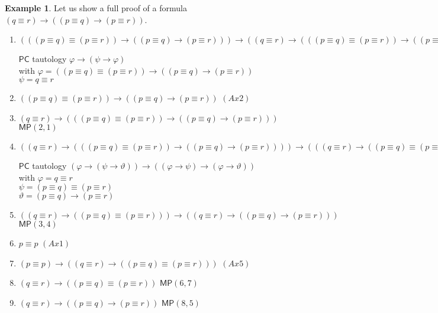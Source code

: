 \documentclass{article}
\theoremstyle{definition}
\theoremstyle{definition}
\newtheorem{example}{Example}[section]
\theoremstyle{definition}
\theoremstyle{definition}
\theoremstyle{definition}
\newcommand*{\id}{\equiv}
\newcommand*{\ra}{\rightarrow}
\newcommand{\PC}{$\mathsf{PC}$\xspace}
\newcommand{\MP}{\mathsf{MP}}
\begin{document}
\begin{example}
    \label{ex_pqr}
    Let us show a full proof of a formula $(q \id r) \ra ((p \id q) \ra (p \id r))$.

    \begin{enumerate}
        \item $(((p \id q) \id (p \id r)) \ra ((p \id q) \ra (p \id r))) \ra ((q \id r) \ra (((p \id q) \id (p \id r)) \ra ((p \id q) \ra (p \id r)))) $
              \begin{flushright} \PC tautology $\varphi \ra (\psi \ra \varphi)$ \\
                  with $\varphi = ((p \id q) \id (p \id r)) \ra ((p \id q) \ra (p \id r))$\\
                  $\psi = q \id r$
              \end{flushright}
        \item $((p \id q) \id (p \id r)) \ra ((p \id q) \ra (p \id r))  $ \hfill $(Ax2)$
        \item $(q \id r) \ra (((p \id q) \id (p \id r)) \ra ((p \id q) \ra (p \id r)))$ \hfill $\MP(2, 1)$
        \item $((q \id r) \ra (((p \id q) \id (p \id r)) \ra ((p \id q) \ra (p \id r)))) \ra (((q \id r) \ra ((p \id q) \id (p \id r))) \ra ((q \id r) \ra ((p \id q) \ra (p \id r)))) $ \begin{flushright}
                  \PC tautology $(\varphi \ra (\psi \ra \vartheta)) \ra ((\varphi \ra \psi) \ra (\varphi \ra \vartheta))$ \\
                  with $\varphi = q \id r$ \\
                  $\psi = (p \id q) \id (p \id r)$ \\
                  $\vartheta = (p \id q) \ra (p \id r)$
              \end{flushright}
        \item $((q \id r) \ra ((p \id q) \id (p \id r))) \ra ((q \id r) \ra ((p \id q) \ra (p \id r))) $ \hfill $\MP(3, 4)$
        \item $p \id p $ \hfill $(Ax1)$
        \item $(p \id p) \ra ((q \id r) \ra ((p \id q) \id (p \id r)))$ \hfill $(Ax5)$
        \item $(q \id r) \ra ((p \id q) \id (p \id r))$ \hfill $\MP(6, 7)$
        \item $(q \id r) \ra ((p \id q) \ra (p \id r))$ \hfill $\MP(8, 5)$
    \end{enumerate}
\end{example}
\end{document}
